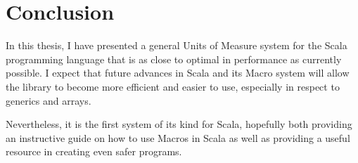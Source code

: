 \documentclass[12pt,oneside,a4paper]{scrbook}
\begin{document}
\chapter{Conclusion}

In this thesis, I have presented a general Units of Measure system for the Scala programming language that is as close to optimal in performance as currently possible. I expect that future advances in Scala and its Macro system will allow the library to become more efficient and easier to use, especially in respect to generics and arrays.

Nevertheless, it is the first system of its kind for Scala, hopefully both providing an instructive guide on how to use Macros in Scala as well as providing a useful resource in creating even safer programs.

\singlespacing

{}
\end{document}
